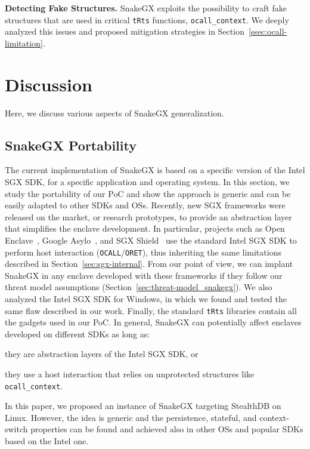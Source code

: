 \textbf{Detecting Fake Structures.}
SnakeGX exploits the possibility to craft fake structures
that are used in critical \texttt{tRts} functions, \ie \texttt{ocall\_context}.
We deeply analyzed this issues and proposed mitigation strategies in 
Section~\ref{ssec:ocall-limitation}.

\section{Discussion}
\label{sec:discussion_snakegx}

Here, we discuss various aspects of SnakeGX generalization.

\subsection{SnakeGX Portability}
The current implementation of SnakeGX is based on a specific version 
of the Intel SGX SDK, for a specific application and operating system.
In this section, we study the portability of our PoC and show the approach 
is generic and can be easily adapted to other SDKs and OSs.
Recently, new SGX frameworks were released on the market, or research 
prototypes, to provide an abstraction layer that simplifies the enclave 
development.
In particular, projects such as Open Enclave~\citep{openenclave}, Google 
Asylo~\citep{asylo}, and SGX Shield~\citep{baumann2015shielding} 
use the standard Intel SGX SDK to perform host 
interaction (\ie \texttt{OCALL}/\texttt{ORET}), thus inheriting the same 
limitations described in Section~\ref{sec:sgx-internal}.
From our point of view, we can implant SnakeGX in any enclave developed with 
these frameworks if they follow our threat model assumptions 
(Section~\ref{sec:threat-model_snakegx}).
We also analyzed the Intel SGX SDK for Windows, in which we found and tested 
the same flaw described in our work.
Finally, the standard \texttt{tRts} libraries contain all the gadgets used in 
our PoC.
In general, SnakeGX can potentially affect enclaves developed on different
SDKs as long as: 
\begin{enumerate*}[label=(\roman*)]
	\item they are abstraction layers of the Intel SGX SDK, or
	\item they use a host interaction that relies on unprotected structures 
	like \texttt{ocall\_context}.
\end{enumerate*}
In this paper, we proposed an instance of SnakeGX targeting StealthDB on Linux. 
However, the idea is generic and the persistence, stateful, and context-switch 
properties can be found and achieved also in other OSs and popular SDKs based 
on the Intel one.

